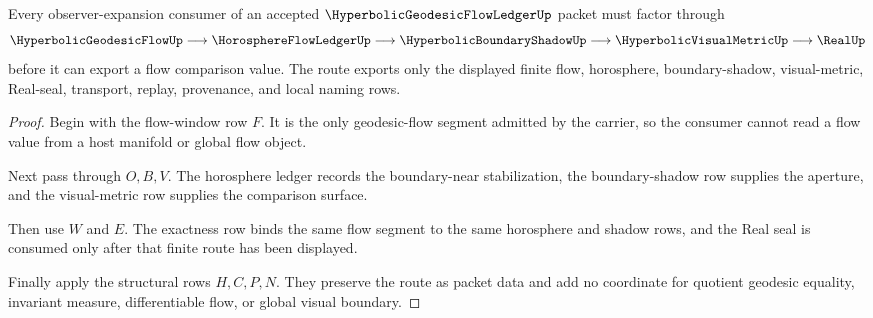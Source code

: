 \begin{theorem}
\label{thm:hyperbolic-geodesic-flow-ledger-boundary-shadow-route}
Every observer-expansion consumer of an accepted $\HyperbolicGeodesicFlowLedgerUp$ packet must factor through
$$
\HyperbolicGeodesicFlowUp \longrightarrow \HorosphereFlowLedgerUp \longrightarrow \HyperbolicBoundaryShadowUp \longrightarrow \HyperbolicVisualMetricUp \longrightarrow \RealUp
$$
before it can export a flow comparison value. The route exports only the displayed finite flow, horosphere, boundary-shadow, visual-metric, Real-seal, transport, replay, provenance, and local naming rows.
\end{theorem}
\begin{proof}
Begin with the flow-window row $F$. It is the only geodesic-flow segment admitted by the carrier, so the consumer cannot read a flow value from a host manifold or global flow object.

Next pass through $O,B,V$. The horosphere ledger records the boundary-near stabilization, the boundary-shadow row supplies the aperture, and the visual-metric row supplies the comparison surface.

Then use $W$ and $E$. The exactness row binds the same flow segment to the same horosphere and shadow rows, and the Real seal is consumed only after that finite route has been displayed.

Finally apply the structural rows $H,C,P,N$. They preserve the route as packet data and add no coordinate for quotient geodesic equality, invariant measure, differentiable flow, or global visual boundary.
\end{proof}




